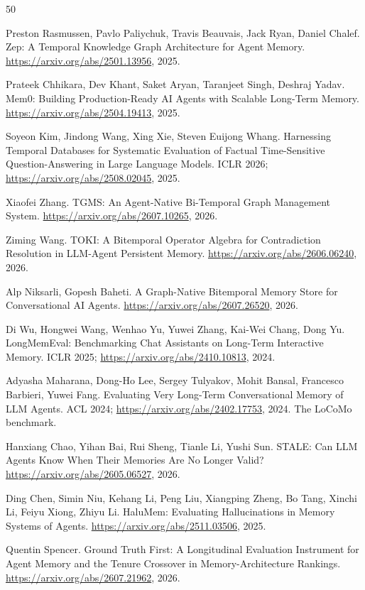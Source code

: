 \documentclass[sigconf, nonacm]{acmart}
\begin{document}
\begin{thebibliography}{50}

Preston Rasmussen, Pavlo Paliychuk, Travis Beauvais, Jack Ryan, Daniel Chalef. Zep: A Temporal Knowledge Graph Architecture for Agent Memory. \url{https://arxiv.org/abs/2501.13956}, 2025.

Prateek Chhikara, Dev Khant, Saket Aryan, Taranjeet Singh, Deshraj Yadav. Mem0: Building Production-Ready AI Agents with Scalable Long-Term Memory. \url{https://arxiv.org/abs/2504.19413}, 2025.

Soyeon Kim, Jindong Wang, Xing Xie, Steven Euijong Whang. Harnessing Temporal Databases for Systematic Evaluation of Factual Time-Sensitive Question-Answering in Large Language Models. ICLR 2026; \url{https://arxiv.org/abs/2508.02045}, 2025.

Xiaofei Zhang. TGMS: An Agent-Native Bi-Temporal Graph Management System. \url{https://arxiv.org/abs/2607.10265}, 2026.

Ziming Wang. TOKI: A Bitemporal Operator Algebra for Contradiction Resolution in LLM-Agent Persistent Memory. \url{https://arxiv.org/abs/2606.06240}, 2026.

Alp Niksarli, Gopesh Baheti. A Graph-Native Bitemporal Memory Store for Conversational AI Agents. \url{https://arxiv.org/abs/2607.26520}, 2026.

Di Wu, Hongwei Wang, Wenhao Yu, Yuwei Zhang, Kai-Wei Chang, Dong Yu. LongMemEval: Benchmarking Chat Assistants on Long-Term Interactive Memory. ICLR 2025; \url{https://arxiv.org/abs/2410.10813}, 2024.

Adyasha Maharana, Dong-Ho Lee, Sergey Tulyakov, Mohit Bansal, Francesco Barbieri, Yuwei Fang. Evaluating Very Long-Term Conversational Memory of LLM Agents. ACL 2024; \url{https://arxiv.org/abs/2402.17753}, 2024. The LoCoMo benchmark.

Hanxiang Chao, Yihan Bai, Rui Sheng, Tianle Li, Yushi Sun. STALE: Can LLM Agents Know When Their Memories Are No Longer Valid? \url{https://arxiv.org/abs/2605.06527}, 2026.

Ding Chen, Simin Niu, Kehang Li, Peng Liu, Xiangping Zheng, Bo Tang, Xinchi Li, Feiyu Xiong, Zhiyu Li. HaluMem: Evaluating Hallucinations in Memory Systems of Agents. \url{https://arxiv.org/abs/2511.03506}, 2025.

Quentin Spencer. Ground Truth First: A Longitudinal Evaluation Instrument for Agent Memory and the Tenure Crossover in Memory-Architecture Rankings. \url{https://arxiv.org/abs/2607.21962}, 2026.


\end{thebibliography}
\end{document}
